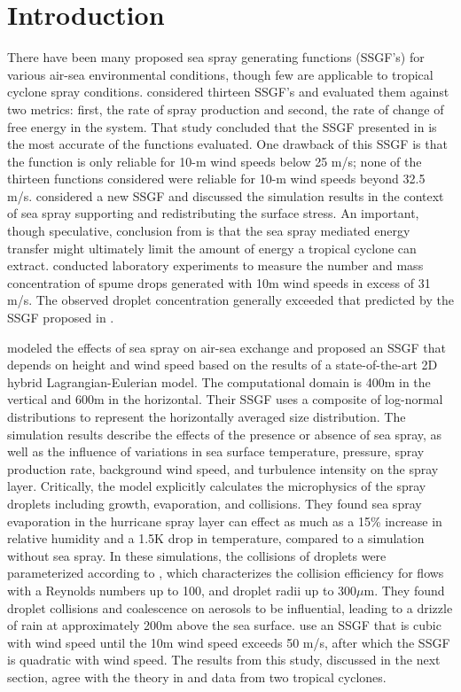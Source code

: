 \documentclass[17pt,a4paper]{article}
\begin{document}
\section{Introduction}
There have been many proposed sea spray generating functions (SSGF's) for various air-sea environmental conditions, though few are applicable to tropical cyclone spray conditions. \citet{Andreas2002} considered thirteen SSGF's and evaluated them against two metrics: first, the rate of spray production and second, the rate of change of free energy in the system. That study concluded that the SSGF presented in \citet{fairall1994} is the most accurate of the functions evaluated. One drawback of this SSGF is that the function is only reliable for 10-m wind speeds below 25 m/s; none of the thirteen functions considered were reliable for 10-m wind speeds beyond 32.5 m/s. \citet{Andreas2004} considered a new SSGF and discussed the simulation results in the context of sea spray supporting and redistributing the surface stress. An important, though speculative, conclusion from \citet{Andreas2004} is that the sea spray mediated energy transfer might ultimately limit the amount of energy a tropical cyclone can extract. \citet{veron2012} conducted laboratory experiments to measure the number and mass concentration of spume drops generated with 10m wind speeds in excess of 31 m/s. The observed droplet concentration generally exceeded that predicted by the SSGF proposed in \citet{fairall1994}. \par 
\citet{Shpund2011,Shpund2012,Shpund2014} modeled the effects of sea spray on air-sea exchange and proposed an SSGF that depends on height and wind speed based on the results of a state-of-the-art 2D hybrid Lagrangian-Eulerian model. The computational domain is 400m in the vertical and 600m in the horizontal. Their SSGF uses a composite of log-normal distributions to represent the horizontally averaged size distribution. The simulation results describe the effects of the presence or absence of sea spray, as well as the influence of variations in sea surface temperature, pressure, spray production rate, background wind speed, and turbulence intensity on the spray layer. Critically, the model explicitly calculates the microphysics of the spray droplets including growth, evaporation, and collisions. They found sea spray evaporation in the hurricane spray layer can effect as much as a 15\% increase in relative humidity and a 1.5K drop in temperature, compared to a simulation without sea spray. In these simulations, the collisions of droplets were parameterized according to \citet{Pinsky2001}, which characterizes the collision efficiency for flows with a Reynolds numbers up to 100, and droplet radii up to 300$\mu$m. They found droplet collisions and coalescence on aerosols to be influential, leading to a drizzle of rain at approximately 200m above the sea surface. \citet{Zweers2015} use an SSGF that is cubic with wind speed until the 10m wind speed exceeds 50 m/s, after which the SSGF is quadratic with wind speed. The results from this study, discussed in the next section, agree with the theory in \citet{Emanuel1995} and data from two tropical cyclones.\par
\end{document}
